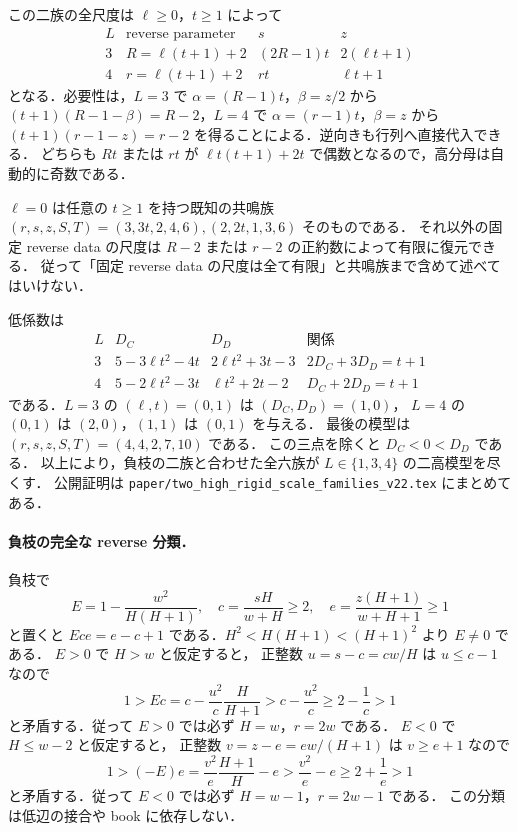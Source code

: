 この二族の全尺度は $\ell\ge0$，$t\ge1$ によって
\[
 \begin{array}{c|c|c|c}
 L&\text{reverse parameter}&s&z\\\hline
 3&R=\ell(t+1)+2&(2R-1)t&2(\ell t+1)\\
 4&r=\ell(t+1)+2&rt&\ell t+1
 \end{array}
\]
となる．必要性は，$L=3$ で $\alpha=(R-1)t$，$\beta=z/2$ から
$(t+1)(R-1-\beta)=R-2$，$L=4$ で $\alpha=(r-1)t$，$\beta=z$ から
$(t+1)(r-1-z)=r-2$ を得ることによる．逆向きも行列へ直接代入できる．
どちらも $Rt$ または $rt$ が $\ell t(t+1)+2t$ で偶数となるので，高分母は自動的に奇数である．

$\ell=0$ は任意の $t\ge1$ を持つ既知の共鳴族
$(r,s,z,S,T)=(3,3t,2,4,6),(2,2t,1,3,6)$ そのものである．
それ以外の固定 reverse data の尺度は $R-2$ または $r-2$ の正約数によって有限に復元できる．
従って「固定 reverse data の尺度は全て有限」と共鳴族まで含めて述べてはいけない．

低係数は
\[
 \begin{array}{c|cc|c}
 L&D_C&D_D&\text{関係}\\\hline
 3&5-3\ell t^2-4t&2\ell t^2+3t-3&2D_C+3D_D=t+1\\
 4&5-2\ell t^2-3t&\ell t^2+2t-2&D_C+2D_D=t+1
 \end{array}
\]
である．$L=3$ の $(\ell,t)=(0,1)$ は $(D_C,D_D)=(1,0)$，
$L=4$ の $(0,1)$ は $(2,0)$，$(1,1)$ は $(0,1)$ を与える．
最後の模型は $(r,s,z,S,T)=(4,4,2,7,10)$ である．
この三点を除くと $D_C<0<D_D$ である．
以上により，負枝の二族と合わせた全六族が $L\in\{1,3,4\}$ の二高模型を尽くす．
公開証明は \nolinkurl{paper/two_high_rigid_scale_families_v22.tex} にまとめてある．

\paragraph{負枝の完全な reverse 分類．}
負枝で
\[
 E=1-\frac{w^2}{H(H+1)},\quad
 c=\frac{sH}{w+H}\ge2,\quad
 e=\frac{z(H+1)}{w+H+1}\ge1
\]
と置くと $Ece=e-c+1$ である．$H^2<H(H+1)<(H+1)^2$ より $E\ne0$ である．
$E>0$ で $H>w$ と仮定すると，
正整数 $u=s-c=cw/H$ は $u\le c-1$ なので
\[
 1>Ec=c-\frac{u^2}{c}\frac{H}{H+1}
 >c-\frac{u^2}{c}\ge2-\frac1c>1
\]
と矛盾する．従って $E>0$ では必ず $H=w$，$r=2w$ である．
$E<0$ で $H\le w-2$ と仮定すると，
正整数 $v=z-e=ew/(H+1)$ は $v\ge e+1$ なので
\[
 1>(-E)e=\frac{v^2}{e}\frac{H+1}{H}-e
 >\frac{v^2}{e}-e\ge2+\frac1e>1
\]
と矛盾する．従って $E<0$ では必ず $H=w-1$，$r=2w-1$ である．
この分類は低辺の接合や book に依存しない．

